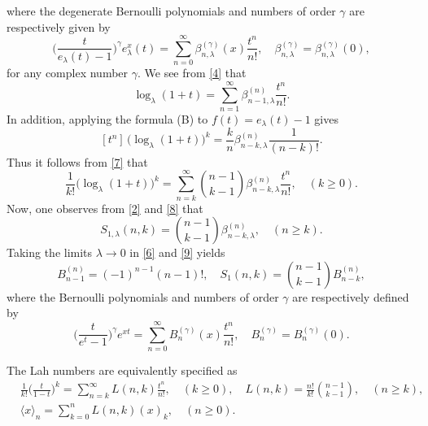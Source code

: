 \documentclass[a4paper,11pt]{amsart}
\begin{document}
where the degenerate Bernoulli polynomials and numbers of order $\gamma$ are respectively given by
\begin{equation} \label{5}
\Big(\frac{t}{e_{\lambda}(t)-1}\Big)^{\gamma}e_{\lambda}^{x}(t)=\sum_{n=0}^{\infty}\beta_{n,\lambda}^{(\gamma)}(x)\frac{t^{n}}{n!},\quad \beta_{n,\lambda}^{(\gamma)}=\beta_{n,\lambda}^{(\gamma)}(0),
\end{equation}
for any complex number $\gamma$.
We see from \eqref{4} that
\begin{equation} \label{6}
\log_{\lambda}(1+t)=\sum_{n=1}^{\infty}\beta_{n-1,\lambda}^{(n)}\frac{t^{n}}{n!}.
\end{equation}
In addition, applying the formula (B) to $f(t)=e_{\lambda}(t)-1$ gives
\begin{equation} \label{7}
[t^{n}]\,\big(\log_{\lambda}(1+t)\big)^{k}=\frac{k}{n}\beta_{n-k,\lambda}^{(n)}\frac{1}{(n-k)!}.
\end{equation}
Thus it follows from \eqref{7} that 
\begin{equation} \label{8}
\frac{1}{k!}\big(\log_{\lambda}(1+t)\big)^{k}=\sum_{n=k}^{\infty}\binom{n-1}{k-1}\beta_{n-k,\lambda}^{(n)}\frac{t^{n}}{n!},\quad (k \ge 0).
\end{equation}
Now, one observes from \eqref{2} and \eqref{8} that
\begin{equation} \label{9}
S_{1,\lambda}(n,k)=\binom{n-1}{k-1}\beta_{n-k,\lambda}^{(n)}, \quad (n \ge k).
\end{equation}
Taking the limits $\lambda \rightarrow 0$ in \eqref{6} and \eqref{9} yields
\begin{equation*}
B_{n-1}^{(n)}=(-1)^{n-1}(n-1)!,\quad S_{1}(n,k)=\binom{n-1}{k-1}B_{n-k}^{(n)},
\end{equation*}
where the Bernoulli polynomials and numbers of order $\gamma$ are respectively defined by
\begin{equation} \label{10}
\Big(\frac{t}{e^{t}-1} \Big)^{\gamma}e^{x t}=\sum_{n=0}^{\infty}B_{n}^{(\gamma)}(x)\frac{t^{n}}{n!},\quad B_{n}^{(\gamma)}=B_{n}^{(\gamma)}(0).
\end{equation} \par
The Lah numbers are equivalently specified as
\begin{equation} \label{11}
\begin{aligned}
&\frac{1}{k!}\Big(\frac{t}{1-t}\Big)^{k}=\sum_{n=k}^{\infty}L(n,k)\frac{t^{n}}{n!}, \quad (k \ge 0),\quad L(n,k)=\frac{n!}{k!}\binom{n-1}{k-1},\quad (n \ge k), \\
&\langle x \rangle_{n}=\sum_{k=0}^{n}L(n,k)(x)_{k}, \quad (n \ge 0).
\end{aligned}
\end{equation}
\end{document}
